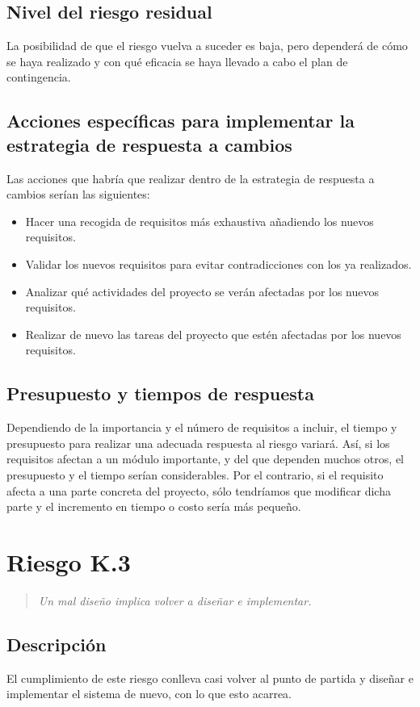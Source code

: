 \documentclass[11pt,a4paper,spanish,twoside]{book}
\begin{document}
\subsection{Nivel del riesgo residual}
La posibilidad de que el riesgo vuelva a suceder es baja, pero dependerá de 
cómo se haya realizado y con qué eficacia se haya llevado a cabo el plan de 
contingencia.

\subsection{Acciones específicas para implementar la estrategia de respuesta
  a cambios}
Las acciones que habría que realizar dentro de la estrategia de respuesta a
cambios serían las siguientes:
\begin{itemize}
\item Hacer una recogida de requisitos más exhaustiva añadiendo los nuevos 
  requisitos.
\item Validar los nuevos requisitos para evitar contradicciones con los ya 
  realizados.
\item Analizar qué actividades del proyecto se verán afectadas por los nuevos 
  requisitos.
\item Realizar de nuevo las tareas del proyecto que estén afectadas por los 
  nuevos requisitos.
\end{itemize}

\subsection{Presupuesto y tiempos de respuesta}
Dependiendo de la importancia y el número de requisitos a incluir, el tiempo y 
presupuesto para realizar una adecuada respuesta al riesgo variará. Así, si los 
requisitos afectan a un módulo importante, y del que dependen muchos otros, el 
presupuesto y el tiempo serían considerables. Por el contrario, si el
requisito afecta a una parte concreta del proyecto, sólo tendríamos que 
modificar dicha parte y el incremento en tiempo o costo sería más pequeño.

\section{Riesgo K.3}
\begin{quote}
  \emph{Un mal diseño implica volver a diseñar e implementar.}
\end{quote}

\subsection{Descripción}
El cumplimiento de este riesgo conlleva casi volver al punto de partida y
diseñar e implementar el sistema de nuevo, con lo que esto acarrea.
\end{document}
